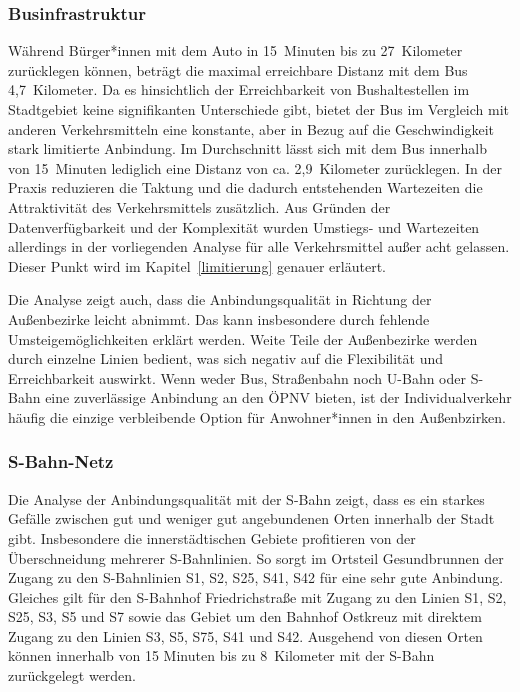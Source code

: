 \subsubsection{Businfrastruktur}

Während Bürger*innen mit dem Auto in 15~Minuten bis zu 27~Kilometer zurücklegen können, beträgt die maximal erreichbare Distanz mit dem Bus 4,7~Kilometer. Da es hinsichtlich der Erreichbarkeit von Bushaltestellen im Stadtgebiet keine signifikanten Unterschiede gibt, bietet der Bus im Vergleich mit anderen Verkehrsmitteln eine konstante, aber in Bezug auf die Geschwindigkeit stark limitierte Anbindung. Im Durchschnitt lässt sich mit dem Bus innerhalb von 15~Minuten lediglich eine Distanz von ca. 2,9~Kilometer zurücklegen. In der Praxis reduzieren die Taktung und die dadurch entstehenden Wartezeiten die Attraktivität des Verkehrsmittels zusätzlich. Aus Gründen der Datenverfügbarkeit und der Komplexität wurden  Umstiegs- und Wartezeiten allerdings in der vorliegenden Analyse für alle Verkehrsmittel außer acht gelassen. Dieser Punkt wird im Kapitel~\ref{limitierung} genauer erläutert.


Die Analyse zeigt auch, dass die Anbindungsqualität in Richtung der Außenbezirke leicht abnimmt. Das kann insbesondere durch fehlende Umsteigemöglichkeiten erklärt werden. Weite Teile der Außenbezirke werden durch einzelne Linien bedient, was sich negativ auf die Flexibilität und Erreichbarkeit auswirkt. Wenn weder Bus, Straßenbahn noch U-Bahn oder S-Bahn eine zuverlässige Anbindung an den ÖPNV bieten, ist der Individualverkehr häufig die einzige verbleibende Option für Anwohner*innen in den Außenbzirken.

\subsubsection{S-Bahn-Netz}

Die Analyse der Anbindungsqualität mit der S-Bahn zeigt, dass es ein starkes Gefälle zwischen gut und weniger gut angebundenen Orten innerhalb der Stadt gibt. Insbesondere die innerstädtischen Gebiete profitieren von der Überschneidung mehrerer S-Bahnlinien. So sorgt im Ortsteil Gesundbrunnen der Zugang zu den S-Bahnlinien S1, S2, S25, S41, S42 für eine sehr gute Anbindung. Gleiches gilt für den S-Bahnhof Friedrichstraße mit Zugang zu den Linien S1, S2, S25, S3, S5 und S7 sowie das Gebiet um den Bahnhof Ostkreuz mit direktem Zugang zu den Linien S3, S5, S75, S41 und S42. Ausgehend von diesen Orten können innerhalb von 15 Minuten bis zu 8~Kilometer mit der S-Bahn zurückgelegt werden.

